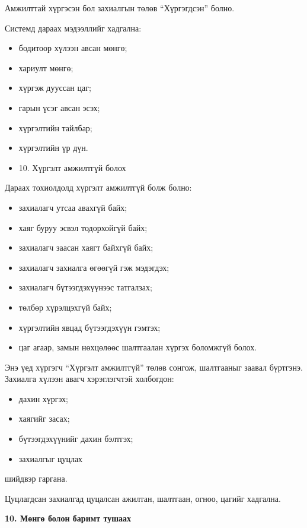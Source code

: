 Амжилттай хүргэсэн бол захиалгын төлөв “Хүргэгдсэн” болно.

Системд дараах мэдээллийг хадгална:

\begin{itemize}
    \item бодитоор хүлээн авсан мөнгө;
    \item хариулт мөнгө;
    \item хүргэж дууссан цаг;
    \item гарын үсэг авсан эсэх;
    \item хүргэлтийн тайлбар;
    \item хүргэлтийн үр дүн.
    \item 10. Хүргэлт амжилтгүй болох
\end{itemize}

Дараах тохиолдолд хүргэлт амжилтгүй болж болно:

\begin{itemize}
    \item захиалагч утсаа авахгүй байх;
    \item хаяг буруу эсвэл тодорхойгүй байх;
    \item захиалагч заасан хаягт байхгүй байх;
    \item захиалагч захиалга өгөөгүй гэж мэдэгдэх;
    \item захиалагч бүтээгдэхүүнээс татгалзах;
    \item төлбөр хүрэлцэхгүй байх;
    \item хүргэлтийн явцад бүтээгдэхүүн гэмтэх;
    \item цаг агаар, замын нөхцөлөөс шалтгаалан хүргэх боломжгүй болох.
\end{itemize}

Энэ үед хүргэгч “Хүргэлт амжилтгүй” төлөв сонгож, шалтгааныг заавал бүртгэнэ. Захиалга хүлээн авагч хэрэглэгчтэй холбогдон:

\begin{itemize}
    \item дахин хүргэх;
    \item хаягийг засах;
    \item бүтээгдэхүүнийг дахин бэлтгэх;
    \item захиалгыг цуцлах
\end{itemize}

шийдвэр гаргана.

Цуцлагдсан захиалгад цуцалсан ажилтан, шалтгаан, огноо, цагийг хадгална.

\textbf{10. Мөнгө болон баримт тушаах}

